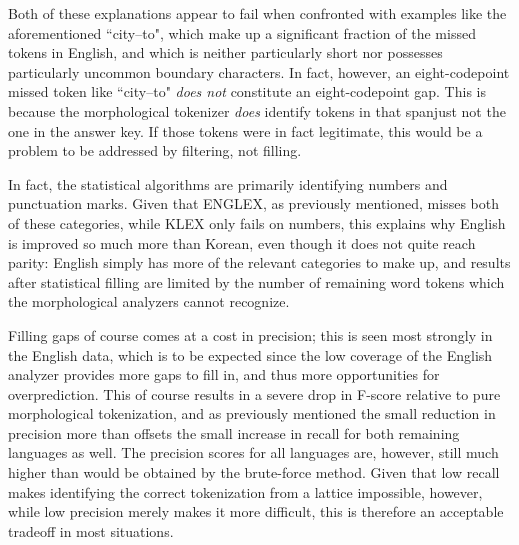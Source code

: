 Both of these explanations appear to fail when confronted with examples like the aforementioned ``city--to", which make up a significant fraction of the missed tokens in English, and which is neither particularly short nor possesses particularly uncommon boundary characters. In fact, however, an eight-codepoint missed token like ``city--to" \textit{does not} constitute an eight-codepoint gap. This is because the morphological tokenizer \textit{does} identify tokens in that span\textemdash just not the one in the answer key. If those tokens were in fact legitimate, this would be a problem to be addressed by filtering, not filling.

In fact, the statistical algorithms are primarily identifying numbers and punctuation marks. Given that ENGLEX, as previously mentioned, misses both of these categories, while KLEX only fails on numbers, this explains why English is improved so much more than Korean, even though it does not quite reach parity: English simply has more of the relevant categories to make up, and results after statistical filling are limited by the number of remaining word tokens which the morphological analyzers cannot recognize.

Filling gaps of course comes at a cost in precision; this is seen most strongly in the English data, which is to be expected since the low coverage of the English analyzer provides more gaps to fill in, and thus more opportunities for overprediction. This of course results in a severe drop in F-score relative to pure morphological tokenization, and as previously mentioned the small reduction in precision more than offsets the small increase in recall for both remaining languages as well. The precision scores for all languages are, however, still much higher than would be obtained by the brute-force method. Given that low recall makes identifying the correct tokenization from a lattice impossible, however, while low precision merely makes it more difficult, this is therefore an acceptable tradeoff in most situations.